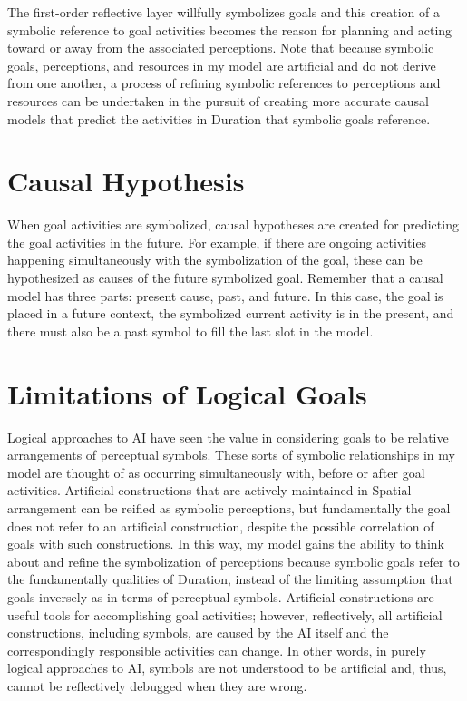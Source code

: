 The first-order reflective layer willfully symbolizes goals and this
creation of a symbolic reference to goal activities becomes the reason
for planning and acting toward or away from the associated
perceptions.  Note that because symbolic goals, perceptions, and
resources in my model are artificial and do not derive from one
another, a process of refining symbolic references to perceptions and
resources can be undertaken in the pursuit of creating more accurate
causal models that predict the activities in Duration that symbolic
goals reference.

\section{Causal Hypothesis}

When goal activities are symbolized, causal hypotheses are created for
predicting the goal activities in the future.  For example, if there
are ongoing activities happening simultaneously with the symbolization
of the goal, these can be hypothesized as causes of the future
symbolized goal.  Remember that a causal model has three parts:
present cause, past, and future.  In this case, the goal is placed in
a future context, the symbolized current activity is in the present,
and there must also be a past symbol to fill the last slot in the
model.

\section{Limitations of Logical Goals}

Logical approaches to AI have seen the value in considering goals to
be relative arrangements of perceptual symbols.  These sorts of
symbolic relationships in my model are thought of as occurring
simultaneously with, before or after goal activities.  Artificial
constructions that are actively maintained in Spatial arrangement can
be reified as symbolic perceptions, but fundamentally the goal does
not refer to an artificial construction, despite the possible
correlation of goals with such constructions.  In this way, my model
gains the ability to think about and refine the symbolization of
perceptions because symbolic goals refer to the fundamentally
qualities of Duration, instead of the limiting assumption that goals
inversely as in terms of perceptual symbols.  Artificial constructions
are useful tools for accomplishing goal activities; however,
reflectively, all artificial constructions, including symbols, are
caused by the AI itself and the correspondingly responsible activities
can change.  In other words, in purely logical approaches to AI,
symbols are not understood to be artificial and, thus, cannot be
reflectively debugged when they are wrong.

